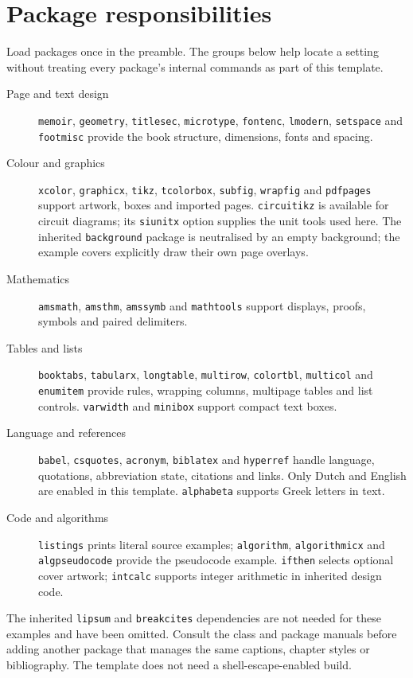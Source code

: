 \section{Package responsibilities}
Load packages once in the preamble. The groups below help locate a setting
without treating every package's internal commands as part of this template.
\begin{description}
\item[Page and text design] \texttt{memoir}, \texttt{geometry}, \texttt{titlesec},
\texttt{microtype}, \texttt{fontenc}, \texttt{lmodern}, \texttt{setspace} and
\texttt{footmisc} provide the book structure, dimensions, fonts and spacing.
\item[Colour and graphics] \texttt{xcolor}, \texttt{graphicx}, \texttt{tikz},
\texttt{tcolorbox}, \texttt{subfig}, \texttt{wrapfig} and \texttt{pdfpages}
support artwork, boxes and imported pages. \texttt{circuitikz} is available for
circuit diagrams; its \texttt{siunitx} option supplies the unit tools used here.
The inherited \texttt{background} package is neutralised by an empty background;
the example covers explicitly draw their own page overlays.
\item[Mathematics] \texttt{amsmath}, \texttt{amsthm}, \texttt{amssymb} and
\texttt{mathtools} support displays, proofs, symbols and paired delimiters.
\item[Tables and lists] \texttt{booktabs}, \texttt{tabularx}, \texttt{longtable},
\texttt{multirow}, \texttt{colortbl}, \texttt{multicol} and \texttt{enumitem}
provide rules, wrapping columns, multipage tables and list controls.
\texttt{varwidth} and \texttt{minibox} support compact text boxes.
\item[Language and references] \texttt{babel}, \texttt{csquotes},
\texttt{acronym}, \texttt{biblatex} and \texttt{hyperref} handle language,
quotations, abbreviation state, citations and links. Only Dutch and English
are enabled in this template. \texttt{alphabeta} supports Greek letters in text.
\item[Code and algorithms] \texttt{listings} prints literal source examples;
\texttt{algorithm}, \texttt{algorithmicx} and \texttt{algpseudocode} provide the
pseudocode example. \texttt{ifthen} selects optional cover artwork;
\texttt{intcalc} supports integer arithmetic in inherited design code.
\end{description}
The inherited \texttt{lipsum} and \texttt{breakcites} dependencies are not needed
for these examples and have been omitted. Consult the class and package manuals
before adding another package that manages the same captions, chapter styles
or bibliography. The template does not need a shell-escape-enabled build.


